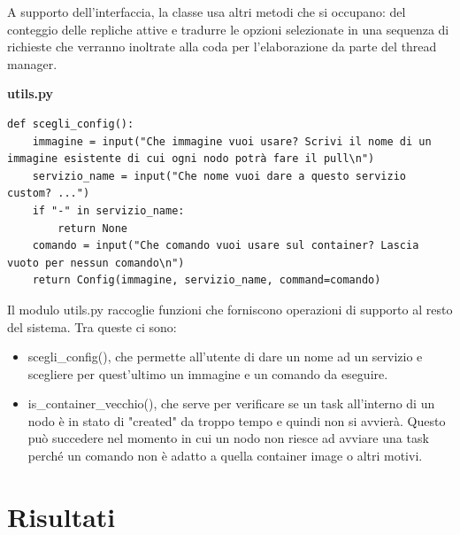 \documentclass[12pt,a4paper]{article}
\begin{document}
A supporto dell'interfaccia, la classe usa altri metodi che si occupano: del conteggio delle repliche attive e tradurre le opzioni selezionate in una sequenza di richieste che verranno inoltrate alla coda per l'elaborazione da parte del thread manager.
\begin{center}
\textbf{utils.py}
\end{center}
\begin{verbatim}
def scegli_config():
    immagine = input("Che immagine vuoi usare? Scrivi il nome di un immagine esistente di cui ogni nodo potrà fare il pull\n")
    servizio_name = input("Che nome vuoi dare a questo servizio custom? ...")
    if "-" in servizio_name:
        return None
    comando = input("Che comando vuoi usare sul container? Lascia vuoto per nessun comando\n")
    return Config(immagine, servizio_name, command=comando)
\end{verbatim}
Il modulo utils.py raccoglie funzioni che forniscono operazioni di supporto al resto del sistema. Tra queste ci sono:
\begin{itemize}
    \item scegli\_config(), che permette all'utente di dare un nome ad un servizio e scegliere per quest'ultimo un immagine e un comando da eseguire.
    \item is\_container\_vecchio(), che serve per verificare se un task all'interno di un nodo è in stato di "created" da troppo tempo e quindi non si avvierà. Questo può succedere nel momento in cui un nodo non riesce ad avviare una task perché un comando non è adatto a quella container image o altri motivi.
\end{itemize}
\newpage

\section{Risultati}
\end{document}
